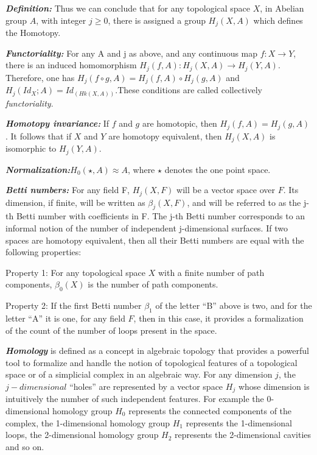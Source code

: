 \textbf{\textit{Definition:}} Thus we can conclude that for any topological space $X$, in Abelian group $A$, with integer $j \ge 0$, there is assigned a group $H_j(X,A)$ which defines the Homotopy.

\textbf{\textit{Functoriality:}} For any A and j as above, and any continuous map $f : X \rightarrow Y$, there is an induced homomorphism $H_j(f,A) : H_j(X,A) \rightarrow H_j(Y,A)$. Therefore, one has $H_j(f \circ g,A) = H_j(f,A) \circ H_j(g,A)$ and $H_j(Id_X;A) = Id_(Hk(X,A))$.These conditions are called collectively \textit{functoriality}.\cite{05_mac2013Functoriality}

\textbf{\textit{Homotopy invariance:}} If $f$ and $g$ are homotopic, then $H_j(f,A)=H_j(g,A)$. It follows that if $X$ and $Y$ are homotopy equivalent, then $H_j(X,A)$ is isomorphic to $H_j(Y,A)$.\cite{01.0_2010introductionTopoPropertiesInvariance} \cite{12.0_alatorre2018TDAinvariant}

\textbf{\textit{Normalization:}}$H_0(\star,A) \approx A$, where $\star$ denotes the one point space.

\textbf{\textit{Betti numbers:}} For any field F, $H_j(X, F)$ will be a vector space over $F$. Its dimension, if finite, will be written as $\beta_j(X, F)$, and will be referred to as the j-th Betti number with coefficients in F. The j-th Betti number corresponds to an informal notion of the number of independent j-dimensional surfaces. If two spaces are homotopy equivalent, then all their Betti numbers are equal with the following properties:

Property 1: For any topological space $X$ with a finite number of path components, $\beta_0(X)$ is the number of path components.

Property 2:  If the first Betti number $\beta_1$ of the letter “B” above is two, and for the letter “A” it is one, for any field $F$, then in this case, it provides a formalization of the count of the number of loops present in the space. \cite{07.2_TopoBettiNumbers} \cite{02_carlsson2009topology}

\textbf{\textit{Homology}}  is defined as a concept in algebraic topology that provides a  powerful tool to formalize and handle the notion of topological features of a topological space or of a simplicial complex in an algebraic way. For any dimension $j$, the $j-dimensional$ “holes” are represented by a vector space $H_j$ whose dimension is intuitively the number of such independent features. For example the 0-dimensional homology group $H_0$ represents the connected components of the complex, the 1-dimensional homology group $H_1$ represents the 1-dimensional loops, the 2-dimensional homology group $H_2$ represents the 2-dimensional cavities and so on.\cite{03.2_2008FindingHomology} \cite{03.3_de2007PersistentHomology} \cite{03.4_2008localizedHomology}


